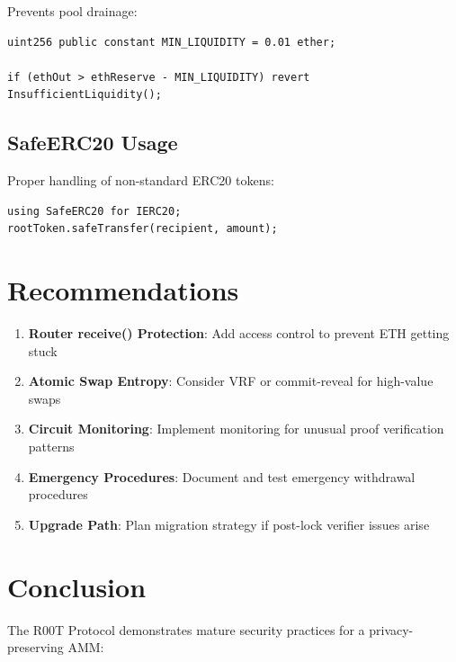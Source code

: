 \documentclass[12pt,a4paper]{article}
\begin{document}
Prevents pool drainage:

\begin{lstlisting}[language=Solidity]
uint256 public constant MIN_LIQUIDITY = 0.01 ether;

if (ethOut > ethReserve - MIN_LIQUIDITY) revert InsufficientLiquidity();
\end{lstlisting}

\subsection{SafeERC20 Usage}

Proper handling of non-standard ERC20 tokens:

\begin{lstlisting}[language=Solidity]
using SafeERC20 for IERC20;
rootToken.safeTransfer(recipient, amount);
\end{lstlisting}

\section{Recommendations}

\begin{enumerate}
    \item \textbf{Router receive() Protection}: Add access control to prevent ETH getting stuck
    \item \textbf{Atomic Swap Entropy}: Consider VRF or commit-reveal for high-value swaps
    \item \textbf{Circuit Monitoring}: Implement monitoring for unusual proof verification patterns
    \item \textbf{Emergency Procedures}: Document and test emergency withdrawal procedures
    \item \textbf{Upgrade Path}: Plan migration strategy if post-lock verifier issues arise
\end{enumerate}

\section{Conclusion}

The R00T Protocol demonstrates mature security practices for a privacy-preserving AMM:
\end{document}
